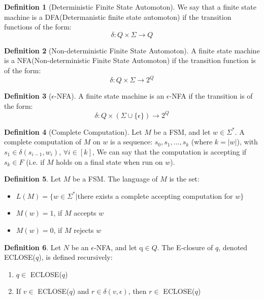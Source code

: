 \documentclass{article}
\theoremstyle{definition}
\newtheorem{define}{Definition}[section]
\begin{document}
\begin{define}[Deterministic Finite State Automoton]
We say that a finite state machine is a DFA(Determanistic finite state automoton) if the transition functions of the form: $$\delta: Q \times \Sigma \rightarrow Q$$
\end{define}

\begin{define}[Non-deterministic Finite State Automoton]
A finite state machine is a NFA(Non-deterministic Finite State Automoton) if the transition function is of the form: $$\delta: Q\times \Sigma \rightarrow 2^Q$$
\end{define}

\begin{define}[$\epsilon$-NFA]
A finite state machine is an $\epsilon$-NFA if the transition is of the form: $$\delta: Q \times (\Sigma \cup \{\epsilon\}) \rightarrow 2^Q$$
\end{define}

\begin{define}[Complete Computation]
Let $M$ be a FSM, and let $w \in \Sigma^*$. A complete computation of $M$ on $w$ is a sequence: $s_0, s_1,...,s_k$ (where $k=|w|$), with $s_1\in \delta(s_{i-1},w_i)$, $\forall i\in [k]$, We can say that the computation is accepting if $s_k \in F$ (i.e. if $M$ holds on a final state when run on $w$).
\end{define}

\begin{define}
Let $M$ be a FSM. The language of $M$ is the set:
	\begin{itemize}
		\item $L(M)=\{w\in \Sigma^*| $there exists a complete accepting computation for $w\}$
		\item $M(w)=1$, if $M$ accepts $w$
		\item $M(w)=0$, if $M$ rejects $w$
	\end{itemize}
\end{define}

\begin{define}
Let $N$ be an $\epsilon$-NFA, and let q$ \in Q$. The  E-closure of $q$, denoted ECLOSE($q$), is defined recursively: 
	\begin{enumerate}
		\item $q \in$  ECLOSE($q$)
		\item If $v \in$ ECLOSE($q$) and  $r \in \delta(v,\epsilon)$, then $r\in$ ECLOSE($q$)
	\end{enumerate}
\end{define}
\end{document}
